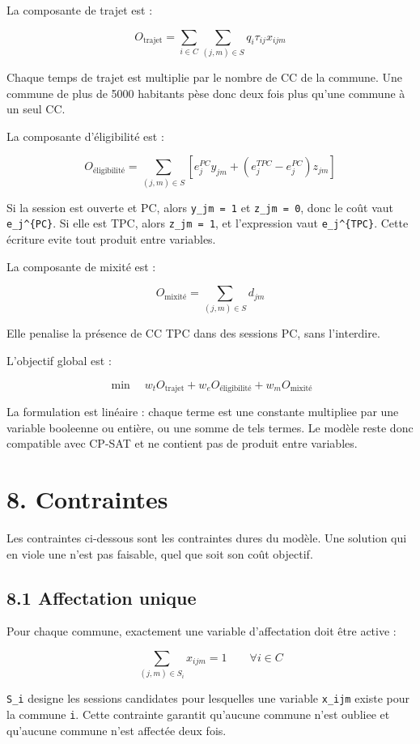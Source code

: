 \documentclass[11pt,a4paper]{article}
\begin{document}
La composante de trajet est :

\[
O_{\text{trajet}}
=
\sum_{i \in C}
\sum_{(j,m)\in S}
q_i \tau_{ij} x_{ijm}
\]

Chaque temps de trajet est multiplie par le nombre de CC de la commune. Une commune de plus de 5000 habitants pèse donc deux fois plus qu'une commune à un seul CC.

La composante d'éligibilité est :

\[
O_{\text{éligibilité}}
=
\sum_{(j,m)\in S}
\left[
e_j^{PC} y_{jm}
+
\left(e_j^{TPC}-e_j^{PC}\right) z_{jm}
\right]
\]

Si la session est ouverte et PC, alors \texttt{y\_jm = 1} et \texttt{z\_jm = 0}, donc le coût vaut \texttt{e\_j\textasciicircum{}\{PC\}}. Si elle est TPC, alors \texttt{z\_jm = 1}, et l'expression vaut \texttt{e\_j\textasciicircum{}\{TPC\}}. Cette écriture evite tout produit entre variables.

La composante de mixité est :

\[
O_{\text{mixité}}
=
\sum_{(j,m)\in S}
d_{jm}
\]

Elle penalise la présence de CC TPC dans des sessions PC, sans l'interdire.

L'objectif global est :

\[
\min
\quad
w_t O_{\text{trajet}}
+
w_e O_{\text{éligibilité}}
+
w_m O_{\text{mixité}}
\]

La formulation est linéaire : chaque terme est une constante multipliee par une variable booleenne ou entière, ou une somme de tels termes. Le modèle reste donc compatible avec CP-SAT et ne contient pas de produit entre variables.

\section{8. Contraintes}

Les contraintes ci-dessous sont les contraintes dures du modèle. Une solution qui en viole une n'est pas faisable, quel que soit son coût objectif.

\subsection{8.1 Affectation unique}

Pour chaque commune, exactement une variable d'affectation doit être active :

\[
\sum_{(j,m)\in S_i} x_{ijm} = 1
\qquad
\forall i \in C
\]

\texttt{S\_i} designe les sessions candidates pour lesquelles une variable \texttt{x\_ijm} existe pour la commune \texttt{i}. Cette contrainte garantit qu'aucune commune n'est oubliee et qu'aucune commune n'est affectée deux fois.
\end{document}
